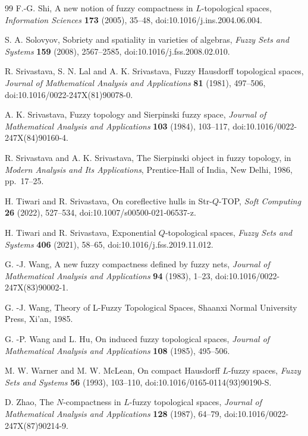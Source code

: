 \documentclass[11pt,a4paper]{article}
\numberwithin{equation}{section}
\theoremstyle{definition}
\theoremstyle{remark}
\begin{document}
\begin{thebibliography}{99}
F.-G. Shi,
A new notion of fuzzy compactness in \(L\)-topological spaces,
\emph{Information Sciences}
\textbf{173} (2005), 35--48,
doi:10.1016/j.ins.2004.06.004.

S. A. Solovyov,
Sobriety and spatiality in varieties of algebras,
\emph{Fuzzy Sets and Systems}
\textbf{159} (2008), 2567--2585,
doi:10.1016/j.fss.2008.02.010.


R. Srivastava, S. N. Lal and A. K. Srivastava,
Fuzzy Hausdorff topological spaces,
\emph{Journal of Mathematical Analysis and Applications}
\textbf{81} (1981), 497--506,
doi:10.1016/0022-247X(81)90078-0.

A. K. Srivastava,
Fuzzy topology and Sierpinski fuzzy space,
\emph{Journal of Mathematical Analysis and Applications}
\textbf{103} (1984), 103--117,
doi:10.1016/0022-247X(84)90160-4.

R. Srivastava and A. K. Srivastava,
The Sierpinski object in fuzzy topology,
in \emph{Modern Analysis and Its Applications},
Prentice-Hall of India, New Delhi, 1986, pp.~17--25.

H. Tiwari and R. Srivastava,
On coreflective hulls in Str-\(Q\)-TOP,
\emph{Soft Computing}
\textbf{26} (2022), 527--534,
doi:10.1007/s00500-021-06537-z.

H. Tiwari and R. Srivastava,
Exponential \(Q\)-topological spaces,
\emph{Fuzzy Sets and Systems}
\textbf{406} (2021), 58--65,
doi:10.1016/j.fss.2019.11.012.

G. -J. Wang,
A new fuzzy compactness defined by fuzzy nets,
\emph{Journal of Mathematical Analysis and Applications}
\textbf{94} (1983), 1--23,
doi:10.1016/0022-247X(83)90002-1.

G. -J. Wang, Theory of L-Fuzzy Topological Spaces, Shaanxi Normal University Press, Xi'an, 1985.

G. -P. Wang and L. Hu,
On induced fuzzy topological spaces,
\emph{Journal of Mathematical Analysis and Applications}
\textbf{108} (1985), 495--506.

M. W. Warner and M. W. McLean,
On compact Hausdorff \(L\)-fuzzy spaces,
\emph{Fuzzy Sets and Systems}
\textbf{56} (1993), 103--110,
doi:10.1016/0165-0114(93)90190-S.

D. Zhao,
The \(N\)-compactness in \(L\)-fuzzy topological spaces,
\emph{Journal of Mathematical Analysis and Applications}
\textbf{128} (1987), 64--79,
doi:10.1016/0022-247X(87)90214-9.

\end{thebibliography}
\end{document}
